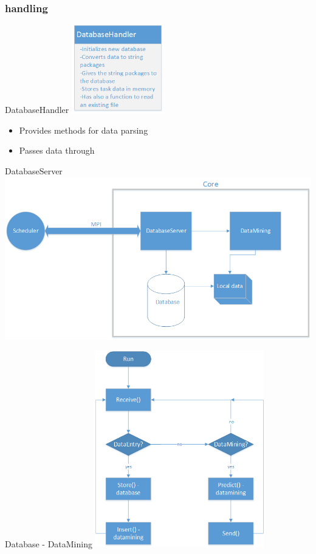 \subsubsection{handling}
	\begin{frame}{DatabaseHandler}
	\includegraphics[width=0.3\textwidth]{images/databasehandler.png}
	\begin{itemize}
		\item Provides methods for data parsing
		\item Passes data through
		
	\end{itemize}
	\end{frame}
	
	\begin{frame}{DatabaseServer}
	\includegraphics[width=1.0\textwidth]{images/Zeichnung6.png}
	\end{frame}
	
	\begin{frame}{Database - DataMining}
	\centering
	\includegraphics[width=0.55\textwidth]{images/datamining_flow.png}
	\end{frame}
